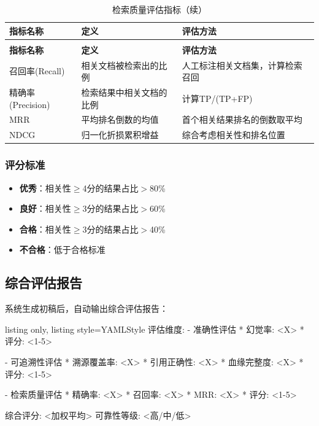 \documentclass[12pt,a4paper,oneside]{article}
\begin{document}
\begin{longtable}{p{3cm}p{4cm}p{4cm}}
    \caption{检索质量评估指标} \\
    \toprule
    \textbf{指标名称} & \textbf{定义} & \textbf{评估方法} \\
    \midrule
    \endfirsthead
    \caption{检索质量评估指标（续）} \\
    \toprule
    \textbf{指标名称} & \textbf{定义} & \textbf{评估方法} \\
    \midrule
    \endhead
    召回率(Recall) & 相关文档被检索出的比例 & 人工标注相关文档集，计算检索召回 \\
    精确率(Precision) & 检索结果中相关文档的比例 & 计算TP/(TP+FP) \\
    MRR & 平均排名倒数的均值 & 首个相关结果排名的倒数取平均 \\
    NDCG & 归一化折损累积增益 & 综合考虑相关性和排名位置 \\
    \bottomrule
\end{longtable}

\subsubsection{评分标准}

\begin{itemize}
    \item \textbf{优秀}：相关性$\ge$4分的结果占比$>$80\%
    \item \textbf{良好}：相关性$\ge$3分的结果占比$>$60\%
    \item \textbf{合格}：相关性$\ge$3分的结果占比$>$40\%
    \item \textbf{不合格}：低于合格标准
\end{itemize}

\subsection{综合评估报告}

系统生成初稿后，自动输出综合评估报告：

\begin{tcblisting}{listing only, listing style=YAMLStyle}
评估维度:
  - 准确性评估
    * 幻觉率: <X>%
    * 评分: <1-5>

  - 可追溯性评估
    * 溯源覆盖率: <X>%
    * 引用正确性: <X>%
    * 血缘完整度: <X>%
    * 评分: <1-5>

  - 检索质量评估
    * 精确率: <X>%
    * 召回率: <X>%
    * MRR: <X>
    * 评分: <1-5>

综合评分: <加权平均>
可靠性等级: <高/中/低>
\end{tcblisting}
\end{document}

